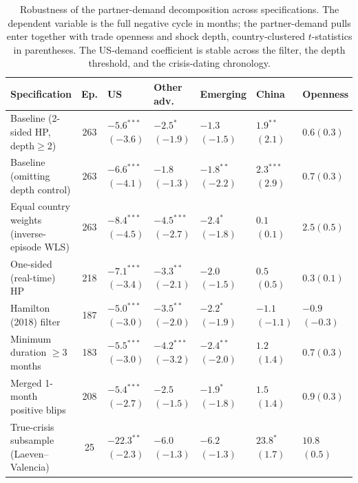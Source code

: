 \begin{table}[H]
\centering\scriptsize
\caption{Robustness of the partner-demand decomposition across specifications. The dependent variable is the full negative cycle in months; the partner-demand pulls enter together with trade openness and shock depth, country-clustered $t$-statistics in parentheses. The US-demand coefficient is stable across the filter, the depth threshold, and the crisis-dating chronology.}
\label{tab:robustness}
\begin{tabularx}{\textwidth}{@{}lcYYYYY@{}}
\toprule
Specification & Ep. & US & Other adv. & Emerging & China & Openness \\ \midrule
Baseline (2-sided HP, depth$\ge$2) & 263 & $-5.6^{***}${\scriptsize$(-3.6)$} & $-2.5^{*}${\scriptsize$(-1.9)$} & $-1.3${\scriptsize$(-1.5)$} & $1.9^{**}${\scriptsize$(2.1)$} & $0.6${\scriptsize$(0.3)$} \\
Baseline (omitting depth control) & 263 & $-6.6^{***}${\scriptsize$(-4.1)$} & $-1.8${\scriptsize$(-1.3)$} & $-1.8^{**}${\scriptsize$(-2.2)$} & $2.3^{***}${\scriptsize$(2.9)$} & $0.7${\scriptsize$(0.3)$} \\
Equal country weights (inverse-episode WLS) & 263 & $-8.4^{***}${\scriptsize$(-4.5)$} & $-4.5^{***}${\scriptsize$(-2.7)$} & $-2.4^{*}${\scriptsize$(-1.8)$} & $0.1${\scriptsize$(0.1)$} & $2.5${\scriptsize$(0.5)$} \\
One-sided (real-time) HP & 218 & $-7.1^{***}${\scriptsize$(-3.4)$} & $-3.3^{**}${\scriptsize$(-2.1)$} & $-2.0${\scriptsize$(-1.5)$} & $0.5${\scriptsize$(0.5)$} & $0.3${\scriptsize$(0.1)$} \\
Hamilton (2018) filter & 187 & $-5.0^{***}${\scriptsize$(-3.0)$} & $-3.5^{**}${\scriptsize$(-2.0)$} & $-2.2^{*}${\scriptsize$(-1.9)$} & $-1.1${\scriptsize$(-1.1)$} & $-0.9${\scriptsize$(-0.3)$} \\
Minimum duration $\ge$3 months & 183 & $-5.5^{***}${\scriptsize$(-3.0)$} & $-4.2^{***}${\scriptsize$(-3.2)$} & $-2.4^{**}${\scriptsize$(-2.0)$} & $1.2${\scriptsize$(1.4)$} & $0.7${\scriptsize$(0.3)$} \\
Merged 1-month positive blips & 208 & $-5.4^{***}${\scriptsize$(-2.7)$} & $-2.5${\scriptsize$(-1.5)$} & $-1.9^{*}${\scriptsize$(-1.8)$} & $1.5${\scriptsize$(1.4)$} & $0.9${\scriptsize$(0.3)$} \\
True-crisis subsample (Laeven--Valencia) & 25 & $-22.3^{**}${\scriptsize$(-2.3)$} & $-6.0${\scriptsize$(-1.3)$} & $-6.2${\scriptsize$(-1.3)$} & $23.8^{*}${\scriptsize$(1.7)$} & $10.8${\scriptsize$(0.5)$} \\

\end{tabularx}
\end{table}
